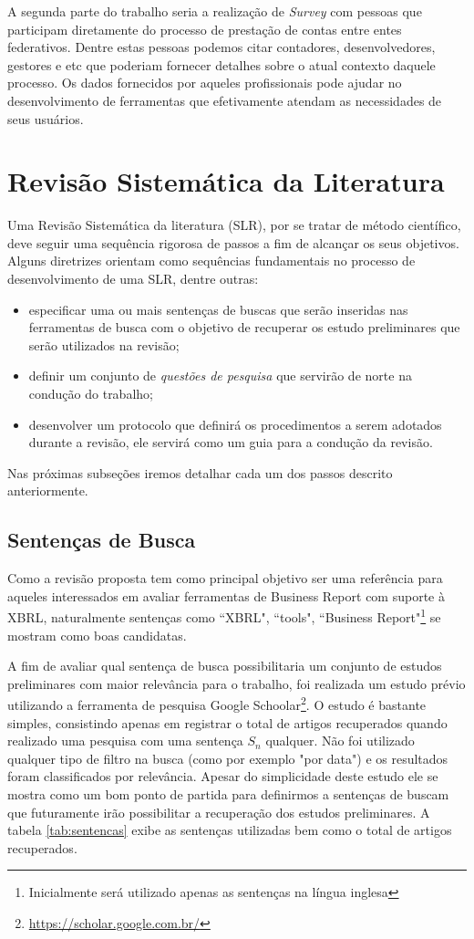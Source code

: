 \documentclass{article}
\begin{document}
A segunda parte do trabalho seria a realização de \textit{Survey} com
pessoas que participam diretamente do processo de prestação de contas
entre entes federativos. Dentre estas pessoas podemos citar
contadores, desenvolvedores, gestores e etc que poderiam fornecer
detalhes sobre o atual contexto daquele processo. Os dados fornecidos
por aqueles profissionais pode ajudar no desenvolvimento de
ferramentas que efetivamente atendam as necessidades de seus usuários.

\section{Revisão Sistemática da Literatura}
\label{sec:rsl}

Uma Revisão Sistemática da literatura (SLR), por se tratar de método
científico, deve seguir uma sequência rigorosa de passos a fim de
alcançar os seus objetivos. Alguns diretrizes orientam como sequências
fundamentais no processo de desenvolvimento de uma
SLR\cite{keele2007guidelines}, dentre outras: 
\begin{itemize}
  \item especificar uma ou mais sentenças de buscas que serão
    inseridas nas ferramentas de busca com o objetivo de recuperar os
    estudo preliminares que serão utilizados na revisão;
  \item definir um conjunto de \textit{questões de pesquisa} que
    servirão de norte na condução do trabalho;
 \item  desenvolver um protocolo que definirá os procedimentos a serem adotados durante a revisão, ele servirá como um guia para a condução da revisão. 
\end{itemize}

Nas próximas subseções iremos detalhar cada um dos passos descrito anteriormente.
\subsection{Sentenças de Busca}
\label{subsec:setences}

Como a revisão proposta tem como principal objetivo ser uma referência para aqueles interessados em avaliar ferramentas de Business Report com suporte à XBRL, naturalmente sentenças como ``XBRL", ``tools", ``Business Report"\footnote{Inicialmente será utilizado apenas as sentenças na língua inglesa} se mostram como boas candidatas. 

A fim de avaliar qual sentença de busca possibilitaria um conjunto de
estudos preliminares com maior relevância para o trabalho, foi
realizada um estudo prévio utilizando a ferramenta de pesquisa Google
Schoolar\footnote{\url{https://scholar.google.com.br/}}. O estudo é
bastante simples, consistindo apenas em registrar o total de artigos
recuperados quando realizado uma pesquisa com uma sentença $S_n$
qualquer. Não foi utilizado qualquer tipo de filtro na busca (como por
exemplo "por data") e os resultados foram classificados por
relevância. Apesar do simplicidade deste estudo ele se mostra como um
bom ponto de partida para definirmos a sentenças de buscam que
futuramente irão possibilitar a recuperação dos estudos preliminares. A tabela \ref{tab:sentencas} exibe as sentenças utilizadas bem como o total de artigos recuperados.
\end{document}
